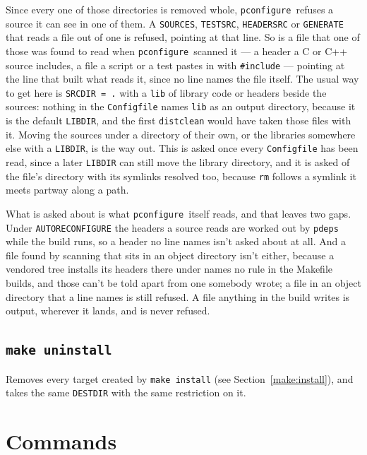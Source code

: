 \documentclass{article}
\newcommand{\pconfigure}{\texttt{pconfigure}}
\begin{document}
Since every one of those directories is removed whole, \pconfigure\
refuses a source it can see in one of them.  A \texttt{SOURCES},
\texttt{TESTSRC}, \texttt{HEADERSRC} or \texttt{GENERATE} that reads
a file out of one is refused, pointing at that line.  So is a file
that one of those was found to read when \pconfigure\ scanned it ---
a header a C or C++ source includes, a file a script or a test
pastes in with \texttt{\#include} --- pointing at the line that
built what reads it, since no line names the file itself.  The usual
way to get here is \texttt{SRCDIR = .} with a \texttt{lib} of library
code or headers beside the sources: nothing in the
\texttt{Configfile} names \texttt{lib} as an output directory,
because it is the default \texttt{LIBDIR}, and the first
\texttt{distclean} would have taken those files with it.  Moving the
sources under a directory of their own, or the libraries somewhere
else with a \texttt{LIBDIR}, is the way out.  This is asked once
every \texttt{Configfile} has been read, since a later
\texttt{LIBDIR} can still move the library directory, and it is asked
of the file's directory with its symlinks resolved too, because
\texttt{rm} follows a symlink it meets partway along a path.

What is asked about is what \pconfigure\ itself reads, and that
leaves two gaps.  Under \texttt{AUTORECONFIGURE} the headers a source
reads are worked out by \texttt{pdeps} while the build runs, so a
header no line names isn't asked about at all.  And a file found by
scanning that sits in an object directory isn't either, because a
vendored tree installs its headers there under names no rule in the
Makefile builds, and those can't be told apart from one somebody
wrote; a file in an object directory that a line names is still
refused.  A file anything in the build writes is output, wherever it
lands, and is never refused.

\subsection{\texttt{make uninstall}}

Removes every target created by \texttt{make install} (see
Section~\ref{make:install}), and takes the same \texttt{DESTDIR}
with the same restriction on it.

\section{Commands \label{cmd}}
\end{document}
